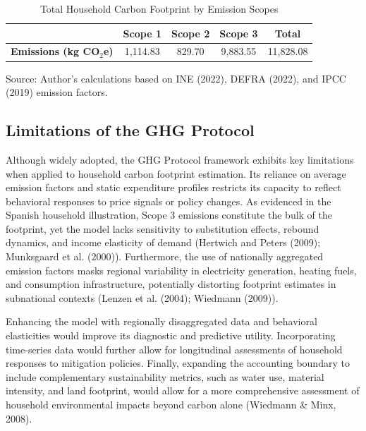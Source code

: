 \documentclass[12pt,a4paper]{article}%
\begin{document}
\begin{table}[h]
  \captionsetup{justification=raggedright,singlelinecheck=false} 
\caption{\small Total Household Carbon Footprint by Emission Scopes}\label{tab:total_emissions}
\begin{tabular}{lcccc}
\toprule
 & \small \textbf{Scope 1} & \small \textbf{Scope 2} & \small \textbf{Scope 3} & \small \textbf{Total} \\
\midrule
\small \textbf{Emissions (kg CO$_2$e)} & \small 1,114.83 & \small 829.70 & \small 9,883.55 & \small 11,828.08 \\
 \bottomrule
\end{tabular}

\raggedright

\vspace{0.3cm}
\footnotesize{Source: Author's calculations based on INE (2022), DEFRA (2022), and IPCC (2019) emission factors.}
\end{table}


\subsection{Limitations of the GHG Protocol}

Although widely adopted, the GHG Protocol framework exhibits key limitations when applied to household carbon footprint estimation. Its reliance on average emission factors and static expenditure profiles restricts its capacity to reflect behavioral responses to price signals or policy changes. As evidenced in the Spanish household illustration, Scope 3 emissions constitute the bulk of the footprint, yet the model lacks sensitivity to substitution effects, rebound dynamics, and income elasticity of demand (Hertwich and Peters (2009); Munksgaard et al. (2000)). Furthermore, the use of nationally aggregated emission factors masks regional variability in electricity generation, heating fuels, and consumption infrastructure, potentially distorting footprint estimates in subnational contexts (Lenzen et al. (2004); Wiedmann (2009)).

Enhancing the model with regionally disaggregated data and behavioral elasticities would improve its diagnostic and predictive utility. Incorporating time-series data would further allow for longitudinal assessments of household responses to mitigation policies. Finally, expanding the accounting boundary to include complementary sustainability metrics, such as water use, material intensity, and land footprint, would allow for a more comprehensive assessment of household environmental impacts beyond carbon alone (Wiedmann \& Minx, 2008).
\end{document}
